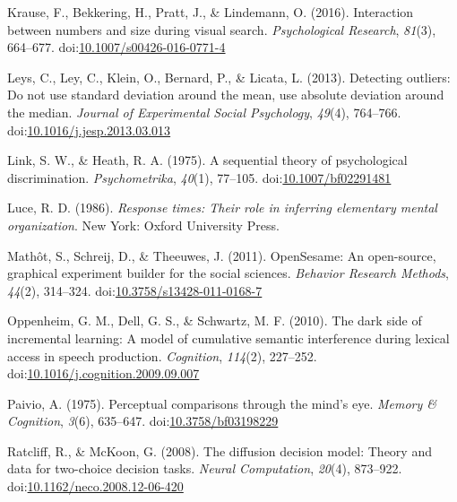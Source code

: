 \documentclass[english,,man]{apa6}
\theoremstyle{definition}
\theoremstyle{definition}
\theoremstyle{definition}
\theoremstyle{remark}
\begin{document}
\leavevmode\hypertarget{ref-krause2016}{}%
Krause, F., Bekkering, H., Pratt, J., \& Lindemann, O. (2016).
Interaction between numbers and size during visual search.
\emph{Psychological Research}, \emph{81}(3), 664--677.
doi:\href{https://doi.org/10.1007/s00426-016-0771-4}{10.1007/s00426-016-0771-4}

\leavevmode\hypertarget{ref-leys2013}{}%
Leys, C., Ley, C., Klein, O., Bernard, P., \& Licata, L. (2013).
Detecting outliers: Do not use standard deviation around the mean, use
absolute deviation around the median. \emph{Journal of Experimental
Social Psychology}, \emph{49}(4), 764--766.
doi:\href{https://doi.org/10.1016/j.jesp.2013.03.013}{10.1016/j.jesp.2013.03.013}

\leavevmode\hypertarget{ref-link1975}{}%
Link, S. W., \& Heath, R. A. (1975). A sequential theory of
psychological discrimination. \emph{Psychometrika}, \emph{40}(1),
77--105.
doi:\href{https://doi.org/10.1007/bf02291481}{10.1007/bf02291481}

\leavevmode\hypertarget{ref-luce1986}{}%
Luce, R. D. (1986). \emph{Response times: Their role in inferring
elementary mental organization}. New York: Oxford University Press.

\leavevmode\hypertarget{ref-opensesame}{}%
Mathôt, S., Schreij, D., \& Theeuwes, J. (2011). OpenSesame: An
open-source, graphical experiment builder for the social sciences.
\emph{Behavior Research Methods}, \emph{44}(2), 314--324.
doi:\href{https://doi.org/10.3758/s13428-011-0168-7}{10.3758/s13428-011-0168-7}

\leavevmode\hypertarget{ref-oppenheim2010}{}%
Oppenheim, G. M., Dell, G. S., \& Schwartz, M. F. (2010). The dark side
of incremental learning: A model of cumulative semantic interference
during lexical access in speech production. \emph{Cognition},
\emph{114}(2), 227--252.
doi:\href{https://doi.org/10.1016/j.cognition.2009.09.007}{10.1016/j.cognition.2009.09.007}

\leavevmode\hypertarget{ref-pavio1975}{}%
Paivio, A. (1975). Perceptual comparisons through the mind's eye.
\emph{Memory \& Cognition}, \emph{3}(6), 635--647.
doi:\href{https://doi.org/10.3758/bf03198229}{10.3758/bf03198229}

\leavevmode\hypertarget{ref-ratcliff2008}{}%
Ratcliff, R., \& McKoon, G. (2008). The diffusion decision model: Theory
and data for two-choice decision tasks. \emph{Neural Computation},
\emph{20}(4), 873--922.
doi:\href{https://doi.org/10.1162/neco.2008.12-06-420}{10.1162/neco.2008.12-06-420}
\end{document}
